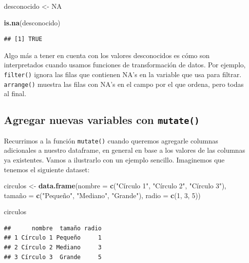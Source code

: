 \documentclass[spanish,]{book}
\newenvironment{Shaded}{\begin{snugshade}}{\end{snugshade}}
\newcommand{\DataTypeTok}[1]{\textcolor[rgb]{0.13,0.29,0.53}{#1}}
\newcommand{\DecValTok}[1]{\textcolor[rgb]{0.00,0.00,0.81}{#1}}
\newcommand{\KeywordTok}[1]{\textcolor[rgb]{0.13,0.29,0.53}{\textbf{#1}}}
\newcommand{\NormalTok}[1]{#1}
\newcommand{\OtherTok}[1]{\textcolor[rgb]{0.56,0.35,0.01}{#1}}
\newcommand{\StringTok}[1]{\textcolor[rgb]{0.31,0.60,0.02}{#1}}
\begin{document}
\begin{Shaded}
\begin{Highlighting}[]
\NormalTok{desconocido <-}\StringTok{ }\OtherTok{NA}

\KeywordTok{is.na}\NormalTok{(desconocido)}
\end{Highlighting}
\end{Shaded}

\begin{verbatim}
## [1] TRUE
\end{verbatim}

Algo más a tener en cuenta con los valores desconocidos es cómo son interpretados cuando usamos funciones de transformación de datos. Por ejemplo, \texttt{filter()} ignora las filas que contienen NA's en la variable que usa para filtrar. \texttt{arrange()} muestra las filas con NA's en el campo por el que ordena, pero todas al final.

\hypertarget{agregar-nuevas-variables-con-mutate}{%
\subsection{\texorpdfstring{Agregar nuevas variables con \texttt{mutate()}}{Agregar nuevas variables con mutate()}}\label{agregar-nuevas-variables-con-mutate}}

Recurrimos a la función \texttt{mutate()} cuando queremos agregarle columnas adicionales a nuestro dataframe, en general en base a los valores de las columnas ya existentes. Vamos a ilustrarlo con un ejemplo sencillo. Imaginemos que tenemos el siguiente dataset:

\begin{Shaded}
\begin{Highlighting}[]
\NormalTok{circulos <-}\StringTok{ }\KeywordTok{data.frame}\NormalTok{(}\DataTypeTok{nombre =} \KeywordTok{c}\NormalTok{(}\StringTok{"Círculo 1"}\NormalTok{, }\StringTok{"Círculo 2"}\NormalTok{, }\StringTok{"Círculo 3"}\NormalTok{),}
\NormalTok{                       tamañ}\DataTypeTok{o =} \KeywordTok{c}\NormalTok{(}\StringTok{"Pequeño"}\NormalTok{, }\StringTok{"Mediano"}\NormalTok{, }\StringTok{"Grande"}\NormalTok{),}
                       \DataTypeTok{radio  =} \KeywordTok{c}\NormalTok{(}\DecValTok{1}\NormalTok{, }\DecValTok{3}\NormalTok{, }\DecValTok{5}\NormalTok{))}

\NormalTok{circulos}
\end{Highlighting}
\end{Shaded}

\begin{verbatim}
##      nombre  tamaño radio
## 1 Círculo 1 Pequeño     1
## 2 Círculo 2 Mediano     3
## 3 Círculo 3  Grande     5
\end{verbatim}
\end{document}
